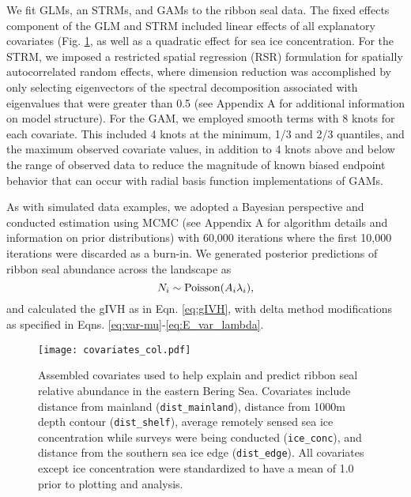 \documentclass[12pt,fleqn]{article}
\begin{document}
\begin{flushleft}
\hspace{0.5in} We fit GLMs, an STRMs, and GAMs to the ribbon seal data.  The fixed effects component of the GLM and STRM included linear effects of all explanatory covariates (Fig. \ref{fig:covs}, as well as a quadratic effect for sea ice concentration.  For the STRM, we imposed a restricted spatial regression (RSR) formulation for spatially autocorrelated random effects, where dimension reduction was accomplished by only selecting eigenvectors of the spectral decomposition associated with eigenvalues that were greater than 0.5 (see Appendix A for additional information on model structure).  For the GAM, we employed smooth terms with 8 knots for each covariate.  This included 4 knots at the minimum, 1/3 and 2/3 quantiles, and the maximum observed covariate values, in addition to 4 knots above and below the range of observed data to reduce the magnitude of known biased endpoint behavior that can occur with radial basis function implementations of GAMs.

As with simulated data examples, we adopted a Bayesian perspective and conducted estimation using MCMC (see Appendix A for algorithm details and information on prior distributions) with 60,000 iterations where the first 10,000 iterations were discarded as a burn-in.  We generated posterior predictions of ribbon seal abundance across the landscape as
\begin{equation}
  N_i \sim {\rm Poisson}(A_i \lambda_i),
\end{equation}
and calculated the gIVH as in Eqn. \ref{eq:gIVH}, with delta method modifications as specified in Eqns. \ref{eq:var-mu}-\ref{eq:E_var_lambda}.


\renewcommand{\refname}{Literature Cited}




\end{flushleft}

\begin{figure}[!h]
\begin{center}
\texttt{[image: covariates\_col.pdf]}
\end{center}
\caption{Assembled covariates used to help explain and predict ribbon seal relative abundance in the eastern Bering Sea.  Covariates include distance from mainland (\texttt{dist\_mainland}), distance from 1000m depth contour (\texttt{dist\_shelf}), average remotely sensed sea ice concentration while surveys were being conducted (\texttt{ice\_conc}), and distance from the southern sea ice edge (\texttt{dist\_edge}).  All covariates except ice concentration were standardized to have a mean of 1.0 prior to plotting and analysis.
}
\label{fig:covs}
\end{figure}
\end{document}
